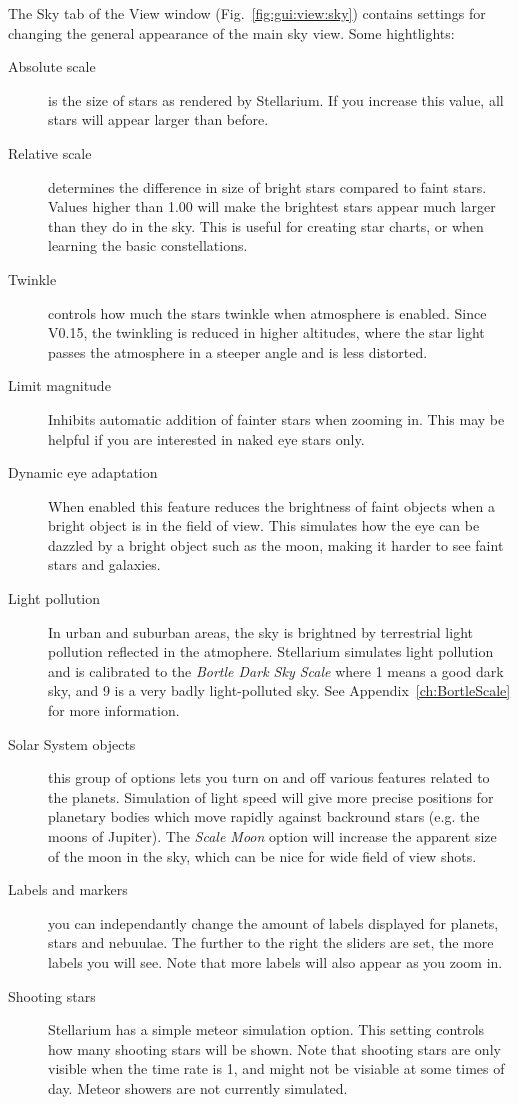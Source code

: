The Sky tab of the View window (Fig.~\ref{fig:gui:view:sky}) contains settings
for changing the general appearance of the main sky view. Some
hightlights:

\begin{description}
\item[Absolute scale] is the size of stars as rendered by
  Stellarium. If you increase this value, all stars will appear larger
  than before.
\item[Relative scale] determines the difference in size of bright
  stars compared to faint stars. Values higher than 1.00 will make the
  brightest stars appear much larger than they do in the sky. This is
  useful for creating star charts, or when learning the basic
  constellations.
\item[Twinkle] controls how much the stars twinkle when atmosphere is
  enabled. Since V0.15, the twinkling is reduced in higher altitudes,
  where the star light passes the atmosphere in a steeper angle and is
  less distorted.
\item[Limit magnitude] Inhibits automatic addition of fainter stars
  when zooming in. This may be helpful if you are interested in naked
  eye stars only.
\item[Dynamic eye adaptation] When enabled this feature reduces the
  brightness of faint objects when a bright object is in the field of
  view. This simulates how the eye can be dazzled by a bright object
  such as the moon, making it harder to see faint stars and galaxies.
\item[Light pollution] In urban and suburban areas, the sky is
  brightned by terrestrial light pollution reflected in the atmophere.
  Stellarium simulates light pollution and is calibrated to the
  \emph{Bortle Dark Sky Scale} where 1 means a good dark sky, and 9 is
  a very badly light-polluted sky. See Appendix~\ref{ch:BortleScale}
  for more information.
\item[Solar System objects] this group of options lets you turn on
  and off various features related to the planets. Simulation of light
  speed will give more precise positions for planetary bodies which move
  rapidly against backround stars (e.g. the moons of Jupiter). The
  \emph{Scale Moon} option will increase the apparent size of the moon
  in the sky, which can be nice for wide field of view shots.
\item[Labels and markers] you can independantly change the amount of
  labels displayed for planets, stars and nebuulae. The further to the
  right the sliders are set, the more labels you will see. Note that
  more labels will also appear as you zoom in.
\item[Shooting stars] Stellarium has a simple meteor simulation
  option. This setting controls how many shooting stars will be shown.
  Note that shooting stars are only visible when the time rate is 1, and
  might not be visiable at some times of day. Meteor showers are not
  currently simulated.
\end{description}

